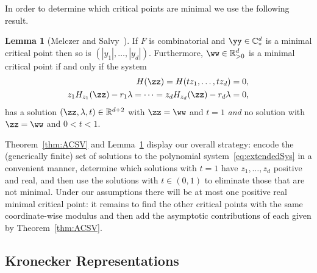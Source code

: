 \documentclass[a4paper]{amsart}
\theoremstyle{definition}
\newtheorem{lemma}[theorem]{Lemma}
\newcommand{\C}{{\mathbb C}}
\newcommand{\R}{{\mathbb R}}
\begin{document}
In order to determine which critical points are minimal we use the following result.

\begin{lemma}[Melczer and Salvy~\cite{MelczerSalvy2021}]
    \label{lem:combmin}
    If $F$ is combinatorial and $\yy\in\C_*^d$ is a minimal critical point then so is $(|y_1|,\dots,|y_d|)$. Furthermore, $\ww \in \R_{>0}^d$ is a minimal critical point if and only if the system
    \begin{equation}
        \begin{split}
            H(\zz) = H(tz_1,\dots,tz_d) &= 0, \\
            z_1H_{z_1}(\zz)-r_1\lambda = \cdots = z_dH_{z_d}(\zz)-r_d\lambda &= 0,
        \end{split}
        \label{eq:extendedSys}
    \end{equation}
    has a solution $(\zz,\lambda,t) \in \R^{d+2}$ with $\zz=\ww$ and $t=1$ \emph{and} no solution with $\zz=\ww$ and $0 < t < 1$.
\end{lemma}

Theorem~\ref{thm:ACSV} and Lemma~\ref{lem:combmin} display our overall strategy: encode the (generically finite) set of solutions to the polynomial system~\eqref{eq:extendedSys} in a convenient manner, determine which solutions with $t=1$ have $z_1,\dots,z_d$ positive and real, and then use the solutions with $t \in (0,1)$ to eliminate those that are not minimal. Under our assumptions there will be at most one positive real minimal critical point: it remains to find the other critical points with the same coordinate-wise modulus and then add the asymptotic contributions of each given by Theorem~\ref{thm:ACSV}.

\subsection{Kronecker Representations}
\end{document}
